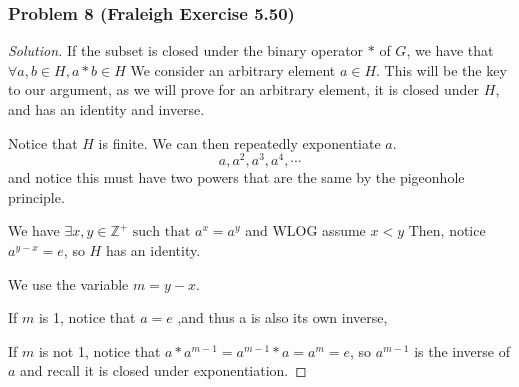 \documentclass[11pt]{article}
\newcommand{\1}{\mathbf{1}}
\theoremstyle{definition}
\newenvironment{solution}{\begin{proof}[Solution]}{\end{proof}}
\begin{document}
\subsubsection*{Problem 8 (Fraleigh Exercise 5.50)}
\begin{solution}
If the subset is closed under the binary operator $*$ of $G$, we have that $\forall a, b
\in H, a * b \in H$
We consider an arbitrary element $ a\in H.$ This will be the key to our argument, as we
will prove for an arbitrary element, it is closed under $H$, and has an identity and
inverse.
\par Notice that $H$ is finite. We can then repeatedly exponentiate $a$.
$$a, a^2, a^3, a^4, \cdots$$ and notice this must have two powers that are the same  by the pigeonhole principle.
\par We have $\exists x, y \in \mathbb{Z}^{+} \text{ such that } a^x = a^y$ and WLOG assume $x
< y$
Then, notice $a^{y - x} = e$, so $H$ has an identity.
\par We use the variable $m =y - x$.
\par If $m$ is 1, notice that $a = e$ ,and thus a is also its own inverse, 
\par If $m$ is not 1, notice that $a * a^{m - 1} =a^{m-1} * a=  a^{m} = e$, so $a^{m-1} $ is the
inverse of $a$ and recall it is closed under exponentiation.
\end{solution}
\end{document}

